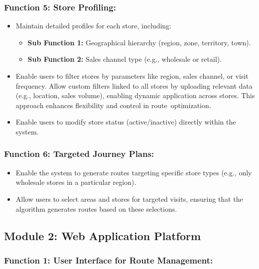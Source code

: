 \subsubsection*{Function 5: Store Profiling: }

\begin{itemize}
    \item Maintain detailed profiles for each store, including:
    \begin{itemize}
        \item[] \textbf{Sub Function 1:} Geographical hierarchy (region, zone, territory, town).
        \item[] \textbf{Sub Function 2:} Sales channel type (e.g., wholesale or retail).
    \end{itemize}
    \item Enable users to filter stores by parameters like region, sales channel, or visit frequency. Allow custom filters linked to all stores by uploading relevant data (e.g., location, sales volume), enabling dynamic application across stores. This approach enhances flexibility and control in route optimization.
    \item Enable users to modify store status (active/inactive) directly within the system.
\end{itemize}

\subsubsection*{Function 6: Targeted Journey Plans:}
 
\begin{itemize}
    \item Enable the system to generate routes targeting specific store types (e.g., only wholesale stores in a particular region).
    \item Allow users to select areas and stores for targeted visits, ensuring that the algorithm generates routes based on these selections.
\end{itemize}

 

\subsection*{Module 2: Web Application Platform 
}

\subsubsection*{Function 1: User Interface for Route Management: 
}

